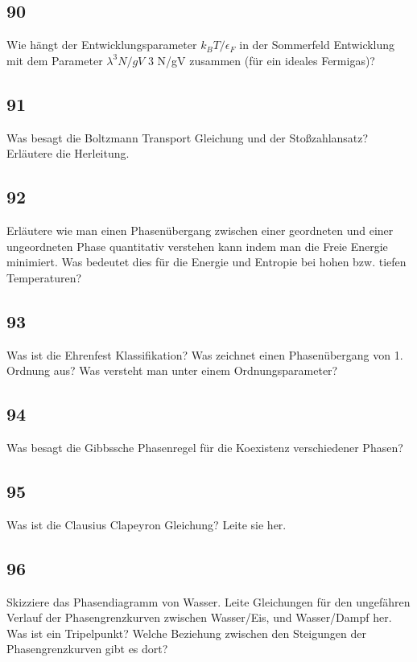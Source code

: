 \subsection{90}
\begin{myfrag}
Wie hängt der Entwicklungsparameter $k_B T/\epsilon_F$ in der Sommerfeld Entwicklung mit dem
Parameter $\lambda^3 N/gV$ 3 N/gV zusammen (für ein ideales Fermigas)?
\end{myfrag}
\subsection{91}
\begin{myfrag}
Was besagt die Boltzmann Transport Gleichung und der Stoßzahlansatz? Erläutere die
Herleitung.
\end{myfrag}
\subsection{92}
\begin{myfrag}
Erläutere wie man einen Phasenübergang zwischen einer geordneten und einer
ungeordneten Phase quantitativ verstehen kann indem man die Freie Energie minimiert.
Was bedeutet dies für die Energie und Entropie bei hohen bzw. tiefen Temperaturen?
\end{myfrag}
\subsection{93}
\begin{myfrag}
Was ist die Ehrenfest Klassifikation? Was zeichnet einen Phasenübergang von 1.
Ordnung aus? Was versteht man unter einem Ordnungsparameter?
\end{myfrag}
\subsection{94}
\begin{myfrag}
Was besagt die Gibbssche Phasenregel für die Koexistenz verschiedener Phasen?
\end{myfrag}
\subsection{95}
\begin{myfrag}
Was ist die Clausius Clapeyron Gleichung? Leite sie her.
\end{myfrag} 
\subsection{96}
\begin{myfrag}
Skizziere das Phasendiagramm von Wasser. Leite Gleichungen für den
ungefähren Verlauf der Phasengrenzkurven zwischen Wasser/Eis, und
Wasser/Dampf her. Was ist ein Tripelpunkt? Welche Beziehung zwischen
den Steigungen der Phasengrenzkurven gibt es dort?
\end{myfrag} 
